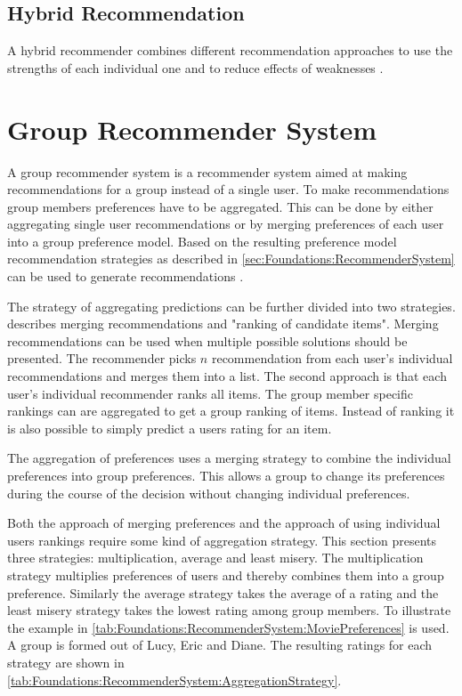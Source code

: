 \subsection{Hybrid Recommendation}
A hybrid recommender combines different recommendation approaches to use the strengths of each individual one and to reduce effects of weaknesses \cite{burkeHybridRecommenderSystems2002}.

\section{Group Recommender System}
\label{sec:Foundations:GroupRecommenderSystem}

A group recommender system is a recommender system aimed at making recommendations for a group instead of a single user. To make recommendations group members preferences have to be aggregated. This can be done by either aggregating single user recommendations or by merging preferences of each user into a group preference model. Based on the resulting preference model recommendation strategies as described in \autoref{sec:Foundations:RecommenderSystem} can be used to generate recommendations \cite{jamesonRecommendationGroups2007}.

The strategy of aggregating predictions can be further divided into two strategies. \citeauthor{felfernigAlgorithmsGroupRecommendation2018} \cite{felfernigAlgorithmsGroupRecommendation2018} describes merging recommendations and "ranking of candidate items". Merging recommendations can be used when multiple possible solutions should be presented. The recommender picks $n$ recommendation from each user's individual recommendations and merges them into a list. The second approach is that each user's individual recommender ranks all items. The group member specific rankings can are aggregated to get a group ranking of items. Instead of ranking it is also possible to simply predict a users rating for an item.

The aggregation of preferences uses a merging strategy to combine the individual preferences into group preferences. This allows a group to change its preferences during the course of the decision without changing individual preferences.

Both the approach of merging preferences and the approach of using individual users rankings require some kind of aggregation strategy. This section presents three strategies: multiplication, average and least misery. The multiplication strategy multiplies preferences of users and thereby combines them into a group preference. Similarly the average strategy takes the average of a rating and the least misery strategy takes the lowest rating among group members. To illustrate the example in \autoref{tab:Foundations:RecommenderSystem:MoviePreferences} is used. A group is formed out of Lucy, Eric and Diane. The resulting ratings for each strategy are shown in \autoref{tab:Foundations:RecommenderSystem:AggregationStrategy}.


